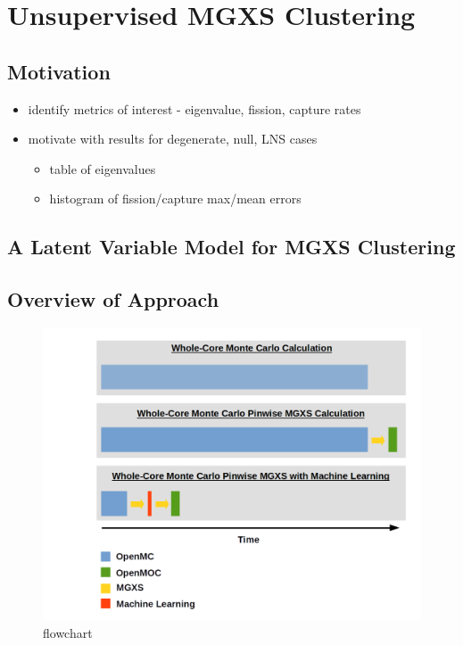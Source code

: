 \chapter{Unsupervised MGXS Clustering}
\label{chap:methods}


\section{Motivation}
\label{sec:chap6-motivate}

\begin{itemize}[noitemsep]
  \item identify metrics of interest - eigenvalue, fission, capture rates
  \item motivate with results for degenerate, null, LNS cases
  \begin{itemize}[noitemsep]
    \item table of eigenvalues
    \item histogram of fission/capture max/mean errors
  \end{itemize}
\end{itemize}


\section{A Latent Variable Model for MGXS Clustering}
\label{sec:chap6-latent-model}


\section{Overview of Approach}
\label{sec:chap6-overview}

\begin{figure}
  \centering
  \includegraphics[width=\linewidth]{figures/pipeline/flow-chart}
  \caption{}
\caption[flowchar]{flowchart}
\label{fig:chap6-flow-chart}
\end{figure}



